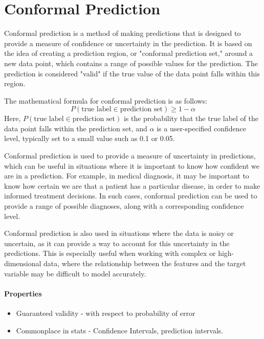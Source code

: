\section{Conformal Prediction}
\begin{definition}
	Conformal prediction is a method of making predictions that is designed to provide a measure of confidence or uncertainty in the prediction. It is based on the idea of creating a prediction region, or "conformal prediction set," around a new data point, which contains a range of possible values for the prediction. The prediction is considered "valid" if the true value of the data point falls within this region.

	The mathematical formula for conformal prediction is as follows:
	\begin{displaymath}
		P(\text{true label} \in \text{prediction set}) \geq 1 - \alpha

	\end{displaymath}
	Here, $P(\text{true label} \in \text{prediction set})$ is the probability that the true label of the data point falls within the prediction set, and $\alpha$ is a user-specified confidence level, typically set to a small value such as 0.1 or 0.05.

	Conformal prediction is used to provide a measure of uncertainty in predictions, which can be useful in situations where it is important to know how confident we are in a prediction. For example, in medical diagnosis, it may be important to know how certain we are that a patient has a particular disease, in order to make informed treatment decisions. In such cases, conformal prediction can be used to provide a range of possible diagnoses, along with a corresponding confidence level.

	Conformal prediction is also used in situations where the data is noisy or uncertain, as it can provide a way to account for this uncertainty in the predictions. This is especially useful when working with complex or high-dimensional data, where the relationship between the features and the target variable may be difficult to model accurately.
\end{definition}
\paragraph{Properties}
\begin{itemize}
	\item Guaranteed validity - with respect to probability of error
	\item Commonplace in stats - Confidence Intervals, prediction intervals.
\end{itemize}

